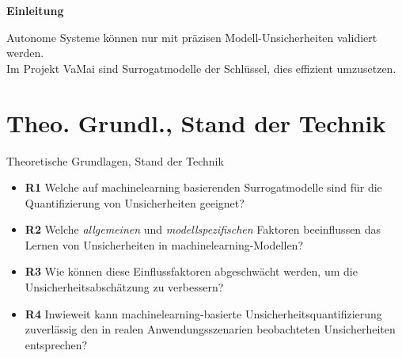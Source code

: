 \documentclass[10pt,a4paper,aspectratio=169]{beamer}
\begin{document}
{\begin{frame}

\vbox{
  \vspace*{-3.5cm}
  {
    \Large \bfseries
    Einleitung
  }
}

\vskip 1cm

\vbox{
  \vspace*{2.2cm}
  {\color{white}
    \normalsize
    Autonome Systeme können nur mit präzisen Modell-Unsicherheiten validiert werden. \\
    Im Projekt VaMai sind Surrogatmodelle der Schlüssel, dies effizient umzusetzen.\\
  }
}

\end{frame}
}




\section[| 1: Theo. Grundl., St. d. Technik]{Theo. Grundl., Stand der Technik}
\begin{frame}{Theoretische Grundlagen, Stand der Technik}
  \begin{itemize}
    \item \textbf{R1} Welche auf \gls{machinelearning} basierenden Surrogatmodelle sind für die Quantifizierung von Unsicherheiten geeignet?
    \item \textbf{R2} Welche \textit{allgemeinen} und \textit{modellspezifischen} Faktoren beeinflussen das Lernen von Unsicherheiten in \gls{machinelearning}-Modellen?
    \item \textbf{R3} Wie können diese Einflussfaktoren abgeschwächt werden, um die Unsicherheitsabschätzung zu verbessern?
    \item \textbf{R4} Inwieweit kann \gls{machinelearning}-basierte Unsicherheitsquantifizierung zuverlässig den in realen Anwendungsszenarien beobachteten Unsicherheiten entsprechen?
    \end{itemize}
\end{frame}
\end{document}
